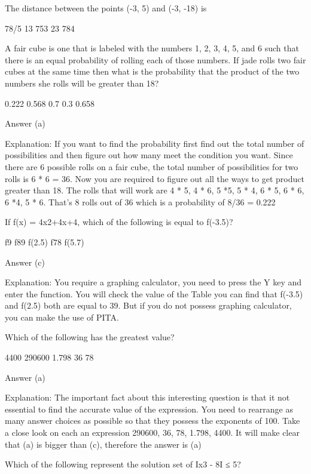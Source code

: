 The distance between the points (-3, 5) and (-3, -18) is

    78/5
    13
    753
    23
    784 



    A fair cube is one that is labeled with the numbers 1, 2, 3, 4, 5, and 6 such that there is an equal probability of rolling each of those numbers. If jade rolls two fair cubes at the same time then what is the probability that the product of the two numbers she rolls will be greater than 18?

        0.222
        0.568
        0.7
        0.3
        0.658 

    Answer (a)

    Explanation: If you want to find the probability first find out the total number of possibilities and then figure out how many meet the condition you want. Since there are 6 possible rolls on a fair cube, the total number of possibilities for two rolls is 6 * 6 = 36. Now you are required to figure out all the ways to get product greater than 18. The rolls that will work are 4 * 5, 4 * 6, 5 *5, 5 * 4, 6 * 5, 6 * 6, 6 *4, 5 * 6. That's 8 rolls out of 36 which is a probability of 8/36 = 0.222

    If f(x) = 4x2+4x+4, which of the following is equal to f(-3.5)?

        f9
        f89
        f(2.5)
        f78
        f(5.7) 

    Answer (c)

    Explanation: You require a graphing calculator, you need to press the Y key and enter the function. You will check the value of the Table you can find that f(-3.5) and f(2.5) both are equal to 39. But if you do not possess graphing calculator, you can make the use of PITA.

    Which of the following has the greatest value?

        4400
        290600
        1.798
        36
        78 

    Answer (a)

    Explanation: The important fact about this interesting question is that it not essential to find the accurate value of the expression. You need to rearrange as many answer choices as possible so that they possess the exponents of 100. Take a close look on each an expression 290600, 36, 78, 1.798, 4400. It will make clear that (a) is bigger than (c), therefore the answer is (a)

    Which of the following represent the solution set of Ιx3 - 8Ι ≤ 5?

